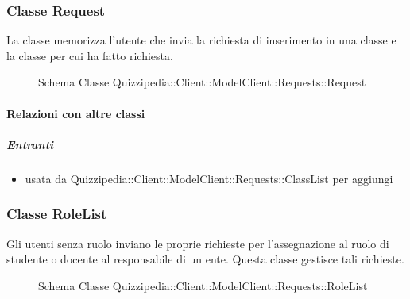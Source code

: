 \subsubsection{Classe Request}
La classe memorizza l'utente che invia la richiesta di inserimento in una classe e la classe per cui ha fatto richiesta.
\begin{figure}[H]
\centering
\noindent{}
\caption[Schema Classe Request]{Schema Classe Quizzipedia::Client::ModelClient::Requests::Request}
\end{figure}
\paragraph{Relazioni con altre classi}
\subparagraph{Entranti}
\begin{itemize}
\item usata da Quizzipedia::Client::ModelClient::Requests::ClassList per aggiungi
\end{itemize}
\subsubsection{Classe RoleList}
Gli utenti senza ruolo inviano le proprie richieste per l'assegnazione al ruolo di studente o docente al responsabile di un ente. Questa classe gestisce tali richieste.
\begin{figure}[H]
\centering
\noindent{}
\caption[Schema Classe RoleList]{Schema Classe Quizzipedia::Client::ModelClient::Requests::RoleList}
\end{figure}
